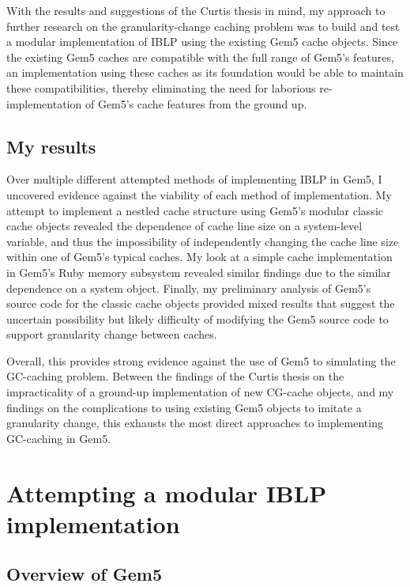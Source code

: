\documentclass[12pt,twoside]{reedthesis}
\begin{document}
	With the results and suggestions of the Curtis thesis in mind, my approach to further research on the granularity-change caching problem was to build and test a modular implementation of IBLP using the existing Gem5 cache objects. Since the existing Gem5 caches are compatible with the full range of Gem5's features, an implementation using these caches as its foundation would be able to maintain these compatibilities, thereby eliminating the need for laborious re-implementation of Gem5's cache features from the ground up.

\section{My results}

Over multiple different attempted methods of implementing IBLP in Gem5, I uncovered evidence against the viability of each method of implementation. My attempt to implement a nestled cache structure using Gem5's modular classic cache objects revealed the dependence of cache line size on a system-level variable, and thus the impossibility of independently changing the cache line size within one of Gem5's typical caches. My look at a simple cache implementation in Gem5's Ruby memory subsystem revealed similar findings due to the similar dependence on a system object. Finally, my preliminary analysis of Gem5's source code for the classic cache objects provided mixed results that suggest the uncertain possibility but likely difficulty of modifying the Gem5 source code to support granularity change between caches.

Overall, this provides strong evidence against the use of Gem5 to simulating the GC-caching problem. Between the findings of the Curtis thesis on the impracticality of a ground-up implementation of new CG-cache objects, and my findings on the complications to using existing Gem5 objects to imitate a granularity change, this exhausts the most direct approaches to implementing GC-caching in Gem5.


\chapter{Attempting a modular IBLP implementation}

\section{Overview of Gem5}
\end{document}
